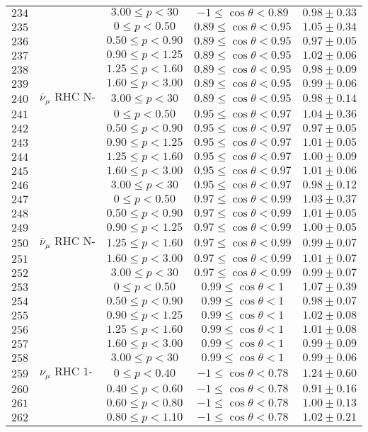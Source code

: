 \begin{longtable}[c]{ccccc}
$234$ &  & $3.00\leq p<30$ & $-1\leq\cos\theta<0.89$ & $0.98\pm0.33$\tabularnewline
$235$ &  & $0\leq p<0.50$ & $0.89\leq\cos\theta<0.95$ & $1.05\pm0.34$\tabularnewline
$236$ &  & $0.50\leq p<0.90$ & $0.89\leq\cos\theta<0.95$ & $0.97\pm0.05$\tabularnewline
$237$ &  & $0.90\leq p<1.25$ & $0.89\leq\cos\theta<0.95$ & $1.02\pm0.06$\tabularnewline
$238$ &  & $1.25\leq p<1.60$ & $0.89\leq\cos\theta<0.95$ & $0.98\pm0.09$\tabularnewline
$239$ &  & $1.60\leq p<3.00$ & $0.89\leq\cos\theta<0.95$ & $0.99\pm0.06$\tabularnewline
$240$ & $\overline{\nu}_{\mu}\text{ RHC N-Trks Wtr}$ & $3.00\leq p<30$ & $0.89\leq\cos\theta<0.95$ & $0.98\pm0.14$\tabularnewline
$241$ &  & $0\leq p<0.50$ & $0.95\leq\cos\theta<0.97$ & $1.04\pm0.36$\tabularnewline
$242$ &  & $0.50\leq p<0.90$ & $0.95\leq\cos\theta<0.97$ & $0.97\pm0.05$\tabularnewline
$243$ &  & $0.90\leq p<1.25$ & $0.95\leq\cos\theta<0.97$ & $1.01\pm0.05$\tabularnewline
$244$ &  & $1.25\leq p<1.60$ & $0.95\leq\cos\theta<0.97$ & $1.00\pm0.09$\tabularnewline
$245$ &  & $1.60\leq p<3.00$ & $0.95\leq\cos\theta<0.97$ & $1.01\pm0.06$\tabularnewline
$246$ &  & $3.00\leq p<30$ & $0.95\leq\cos\theta<0.97$ & $0.98\pm0.12$\tabularnewline
$247$ &  & $0\leq p<0.50$ & $0.97\leq\cos\theta<0.99$ & $1.03\pm0.37$\tabularnewline
$248$ &  & $0.50\leq p<0.90$ & $0.97\leq\cos\theta<0.99$ & $1.01\pm0.05$\tabularnewline
$249$ &  & $0.90\leq p<1.25$ & $0.97\leq\cos\theta<0.99$ & $1.00\pm0.05$\tabularnewline
$250$ & $\overline{\nu}_{\mu}\text{ RHC N-Trks Wtr}$ & $1.25\leq p<1.60$ & $0.97\leq\cos\theta<0.99$ & $0.99\pm0.07$\tabularnewline
$251$ &  & $1.60\leq p<3.00$ & $0.97\leq\cos\theta<0.99$ & $1.01\pm0.07$\tabularnewline
$252$ &  & $3.00\leq p<30$ & $0.97\leq\cos\theta<0.99$ & $0.99\pm0.07$\tabularnewline
$253$ &  & $0\leq p<0.50$ & $0.99\leq\cos\theta<1$ & $1.07\pm0.39$\tabularnewline
$254$ &  & $0.50\leq p<0.90$ & $0.99\leq\cos\theta<1$ & $0.98\pm0.07$\tabularnewline
$255$ &  & $0.90\leq p<1.25$ & $0.99\leq\cos\theta<1$ & $1.02\pm0.08$\tabularnewline
$256$ &  & $1.25\leq p<1.60$ & $0.99\leq\cos\theta<1$ & $1.01\pm0.08$\tabularnewline
$257$ &  & $1.60\leq p<3.00$ & $0.99\leq\cos\theta<1$ & $0.99\pm0.09$\tabularnewline
$258$ &  & $3.00\leq p<30$ & $0.99\leq\cos\theta<1$ & $0.99\pm0.06$\tabularnewline
$259$ & $\nu_{\mu}\text{ RHC 1-Trk Wtr}$ & $0\leq p<0.40$ & $-1\leq\cos\theta<0.78$ & $1.24\pm0.60$\tabularnewline
$260$ &  & $0.40\leq p<0.60$ & $-1\leq\cos\theta<0.78$ & $0.91\pm0.16$\tabularnewline
$261$ &  & $0.60\leq p<0.80$ & $-1\leq\cos\theta<0.78$ & $1.00\pm0.13$\tabularnewline
$262$ &  & $0.80\leq p<1.10$ & $-1\leq\cos\theta<0.78$ & $1.02\pm0.21$\tabularnewline

\end{longtable}
